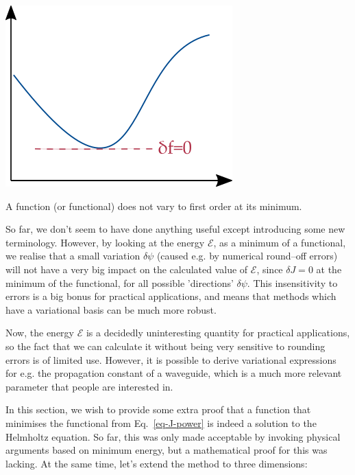 \begin{marginfigure}[1.5cm]
  \includegraphics{numeric/figures/minimum}
  \caption{A function (or functional) does not vary to first order at its minimum.}
  \label{fig-functional-min}
\end{marginfigure}

So far, we don't seem to have done anything useful except introducing some new terminology. However, by looking at the energy $\mathcal{E}$, as a minimum of a functional, we realise that a small variation $\delta \psi$ (caused e.g. by numerical round--off errors) will not have a very big impact on the calculated value of $\mathcal{E}$, since $\delta J=0$ at the minimum of the functional, for all possible 'directions' $\delta \psi$. This insensitivity to errors is a big bonus for practical applications, and means that methods which have a variational basis can be much more robust.

Now, the energy $\mathcal{E}$ is a decidedly uninteresting quantity for practical applications, so the fact that we can calculate it without being very sensitive to rounding errors is of limited use. However, it is possible to derive variational expressions for e.g. the propagation constant of a waveguide, which is a much more relevant parameter that people are interested in.

\pagebreak



In this section, we wish to provide some extra proof that a function that minimises the functional from Eq.~\ref{eq-J-power} is indeed a solution to the Helmholtz equation. So far, this was only made acceptable by invoking physical arguments based on minimum energy, but a mathematical proof for this was lacking. At the same time, let's extend the method to three dimensions:

